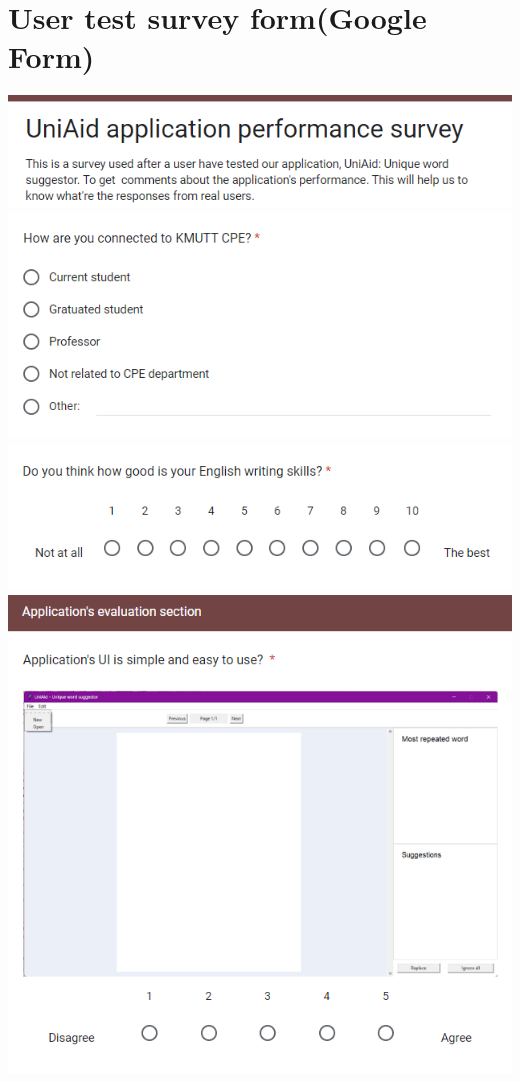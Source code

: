 \documentclass[12pt,oneside,openright,a4paper]{cpe-english-project}
\begin{document}
\section{User test survey form(Google Form)\label{survey}} 
\includegraphics[width=15cm]{./img/Appendix/Survey-1-1.png}
\includegraphics[width=15cm]{./img/Appendix/Survey-1-2.png}
\includegraphics[width=15cm]{./img/Appendix/Survey-1-3.png}
\includegraphics[width=15cm]{./img/Appendix/Survey-2-1.png}
\end{document}
